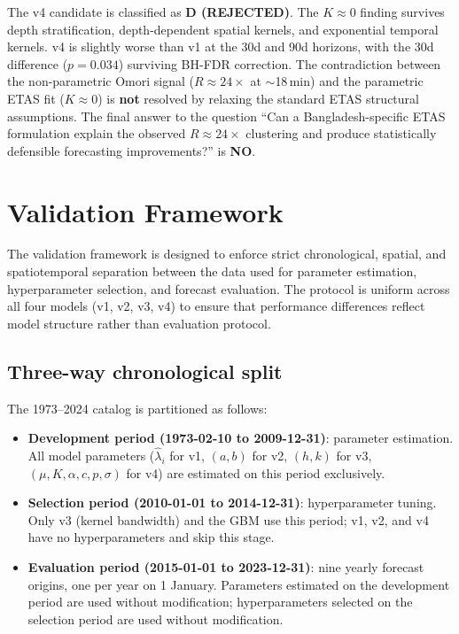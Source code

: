 \documentclass[10pt,a4paper,twocolumn]{article}
\begin{document}
The v4 candidate is classified as \textbf{D (REJECTED)}. The $K\approx0$ finding survives depth stratification, depth-dependent spatial kernels, and exponential temporal kernels. v4 is slightly worse than v1 at the 30d and 90d horizons, with the 30d difference ($p=0.034$) surviving BH-FDR correction. The contradiction between the non-parametric Omori signal ($R\approx24\times$ at $\sim$18\,min) and the parametric ETAS fit ($K\approx0$) is \textbf{not} resolved by relaxing the standard ETAS structural assumptions. The final answer to the question ``Can a Bangladesh-specific ETAS formulation explain the observed $R\approx24\times$ clustering and produce statistically defensible forecasting improvements?'' is \textbf{NO}.

\section{Validation Framework}\label{sec:validation-framework}

The validation framework is designed to enforce strict chronological, spatial, and spatiotemporal separation between the data used for parameter estimation, hyperparameter selection, and forecast evaluation. The protocol is uniform across all four models (v1, v2, v3, v4) to ensure that performance differences reflect model structure rather than evaluation protocol.

\subsection{Three-way chronological split}

The 1973--2024 catalog is partitioned as follows:

\begin{itemize}[leftmargin=1.2em,itemsep=2pt,topsep=2pt]
\item \textbf{Development period (1973-02-10 to 2009-12-31)}: parameter estimation. All model parameters ($\hat\lambda_i$ for v1, $(a,b)$ for v2, $(h,k)$ for v3, $(\mu,K,\alpha,c,p,\sigma)$ for v4) are estimated on this period exclusively.
\item \textbf{Selection period (2010-01-01 to 2014-12-31)}: hyperparameter tuning. Only v3 (kernel bandwidth) and the GBM use this period; v1, v2, and v4 have no hyperparameters and skip this stage.
\item \textbf{Evaluation period (2015-01-01 to 2023-12-31)}: nine yearly forecast origins, one per year on 1 January. Parameters estimated on the development period are used without modification; hyperparameters selected on the selection period are used without modification.
\end{itemize}
\end{document}

